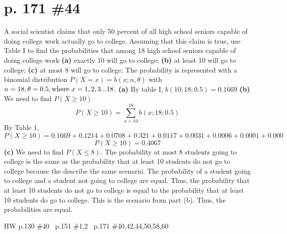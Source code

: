 \documentclass[12pt]{article}
\begin{document}
	\section[20pt]{p. 171 \#44}
	A social scientist claims that only 50 percent of all high school seniors capable of doing college work actually go to college. Assuming that this claim is true, use Table I to find the probabilities that among 18 high school seniors capable of doing college work \newline
	\textbf{(a)} exactly 10 will go to college;
	\newline
	\textbf{(b)} at least 10 will go to college;
	\newline
	\textbf{(c)} at most 8 will go to college;
	\newline
	\newline
	The probability is represented with a binomial distribution \(P(X=x) = b(x;n,\theta)\) with \(n=18, \theta = 0.5, \textup{where } x=1,2,3...18\).\newline
	\newline
	\textbf{(a)} By table I, \(b(10;18;0.5)=0.1669\)
	\newline
	\newline
	\newline
	\textbf{(b)} We need to find \(P(X\geq 10)\)
	\[P(X\geq 10)=\sum_{x=10}^{18}b(x;18;0.5)\]
	By Table 1,
	\[P(X\geq10)=0.1669+0.1214+0.0708+0.321+0.0117+0.0031+0.0006+0.0001+0.000\]
	\[P(X\geq10)=0.4067\]
	\newline
	\newline
	\textbf{(c)} We need to find \(P(X\leq 8)\). \newline
	The probability at most 8 students going to college is the same as the probability that at least 10 students do not go to college because the describe the same scenario. \newline
	\newline
	The probability of a student going to college and a student not going to college are equal. Thus, the probability that at least 10 students do not go to college is equal to the probability that at least 10 students do go to college.
	\newline
	\newline
	This is the scenario from part (b). Thus, the probabilities are equal.
	\newline
	\newline
	\newpage
	\maketitle HW p.130 \#40 \ p.151 \#1,2 \ p.171 \#40,42,44,50,58,60
\end{document}
